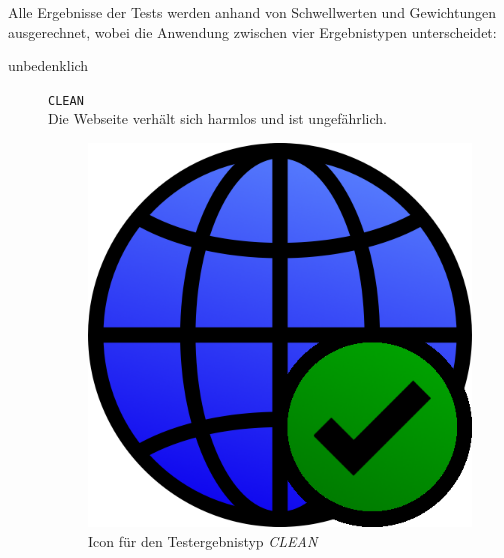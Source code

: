 Alle Ergebnisse der Tests werden anhand von Schwellwerten und Gewichtungen ausgerechnet, wobei die Anwendung zwischen vier Ergebnistypen unterscheidet:
\begin{description}
    \item[unbedenklich] \hfill \texttt{CLEAN} \\
    Die Webseite verhält sich harmlos und ist ungefährlich.
	\begin{figure}[H]
		\centering
		\includegraphics[scale=0.2]{images/webifier-clean}
		\caption{Icon für den Testergebnistyp \textit{CLEAN}}
	\end{figure}


\end{description}

